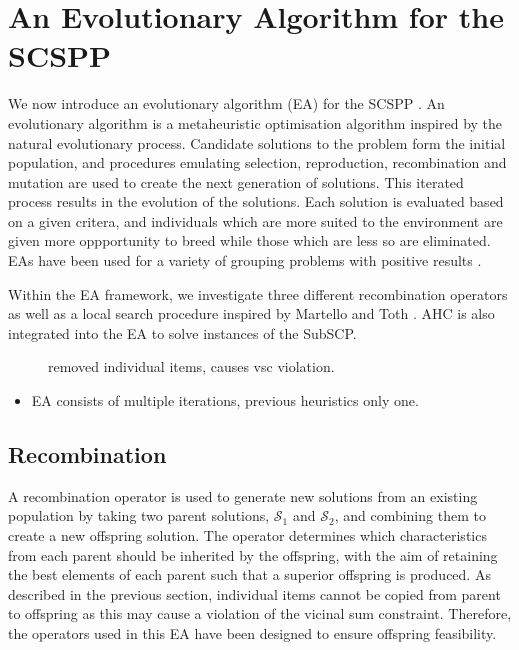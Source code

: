 \documentclass{elsarticle}
\begin{document}
\section{An Evolutionary Algorithm for the SCSPP}
\label{sec:ea}
\noindent We now introduce an evolutionary algorithm (EA) for the SCSPP . An evolutionary algorithm is a metaheuristic optimisation algorithm inspired by the natural evolutionary process. Candidate solutions to the problem form the initial population, and procedures emulating selection, reproduction, recombination and mutation are used to create the next generation of solutions. This iterated process results in the evolution of the solutions. Each solution is evaluated based on a given critera, and individuals which are more suited to the environment are given more oppportunity to breed while those which are less so are eliminated. EAs have been used for a variety of grouping problems with positive results \cite{lewis2017, falkenauer1996, quiroz2015}. 

Within the EA framework, we investigate three different recombination operators as well as a local search procedure inspired by Martello and Toth \cite{martello1990l}. AHC is also integrated into the EA to solve instances of the SubSCP.

\begin{figure}[H]	
	\centering
	
	\caption{removed individual items, causes vsc violation.}	
	\label{fig:eavsc}
\end{figure}

{\color{myRed}
\begin{itemize}[leftmargin=*]
	\item EA consists of multiple iterations, previous heuristics only one.
\end{itemize}
}

\subsection{Recombination}
\label{sub:xover}
\noindent A recombination operator is used to generate new solutions from an existing population by taking two parent solutions, $\mathcal{S}_1$ and $\mathcal{S}_2$, and combining them to create a new offspring solution. The operator determines which characteristics from each parent should be inherited by the offspring, with the aim of retaining the best elements of each parent such that a superior offspring is produced. As described in the previous section, individual items cannot be copied from parent to offspring as this may cause a violation of the vicinal sum constraint. Therefore, the operators used in this EA have been designed to ensure offspring feasibility.
\end{document}
